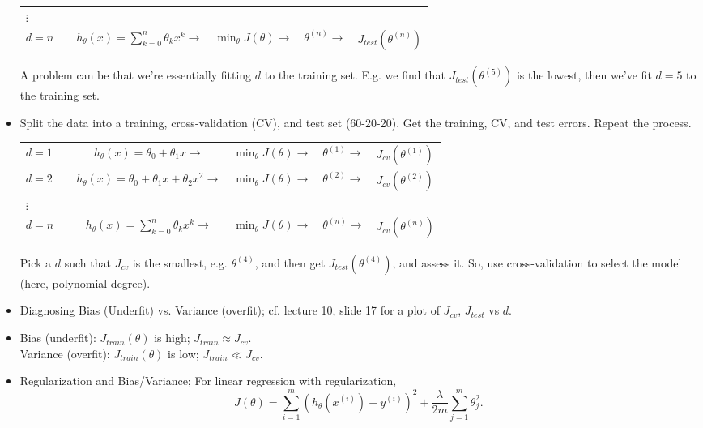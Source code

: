 \documentclass[10pt]{article}
\begin{document}
\begin{itemize}
\begin{center}
\begin{tabular}{ l c c l l }
        $\vdots$ & & & & \\
        $d=n \quad$ & $h_{\theta}(x) = \sum_{k=0}^n \theta_k x^k \rightarrow$ & $\min_{\theta}J(\theta) \rightarrow$ & $\theta^{(n)} \rightarrow$ & $J_{test}(\theta^{(n)})$
      \end{tabular}
    \end{center}
    A problem can be that we're essentially fitting $d$ to the training set. E.g. we find that $J_{test}(\theta^{(5)})$ is the lowest, then we've fit $d=5$ to the training set.
  \item Split the data into a training, cross-validation (CV), and test set (60-20-20). Get the training, CV, and test errors. Repeat the process.
    \begin{center}
      \begin{tabular}{ l c c l l }
        $d=1 \quad$ & $h_{\theta}(x) = \theta_0 + \theta_1x \rightarrow$ & $\min_{\theta}J(\theta) \rightarrow $ & $\theta^{(1)} \rightarrow$ & $J_{cv}(\theta^{(1)})$ \\
        $d=2 \quad$ & $h_{\theta}(x) = \theta_0 + \theta_1x + \theta_2x^2 \rightarrow$ & $\min_{\theta}J(\theta) \rightarrow$ & $\theta^{(2)} \rightarrow$ & $J_{cv}(\theta^{(2)})$ \\
        $\vdots$ & & & & \\
        $d=n \quad$ & $h_{\theta}(x) = \sum_{k=0}^n \theta_k x^k \rightarrow$ & $\min_{\theta}J(\theta) \rightarrow$ & $\theta^{(n)} \rightarrow$ & $J_{cv}(\theta^{(n)})$
      \end{tabular}
    \end{center}
    Pick a $d$ such that $J_{cv}$ is the smallest, e.g. $\theta^{(4)}$, and then get $J_{test}(\theta^{(4)})$, and assess it. So, use cross-validation to select the model (here, polynomial degree).
  \item Diagnosing Bias (Underfit) vs. Variance (overfit); cf. lecture 10, slide 17 for a plot of $J_{cv}$, $J_{test}$ vs $d$.
  \item Bias (underfit): $J_{train}(\theta)$ is high; $J_{train} \approx J_{cv}$. \\
    Variance (overfit):  $J_{train}(\theta)$ is low; $J_{train} \ll J_{cv}$. \\
  \item Regularization and Bias/Variance; For linear regression with
    regularization, 
    \begin{equation*}
      J(\theta) = \sum_{i=1}^m\left(h_{\theta}(x^{(i)}) - y^{(i)} \right)^2 + \frac{\lambda}{2m}\sum_{j=1}^m \theta_j^2. 

\end{equation*}
\end{itemize}
\end{document}
